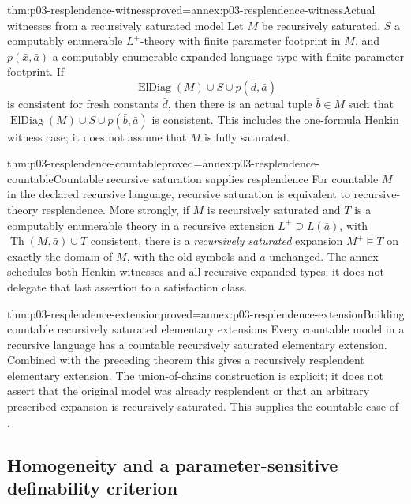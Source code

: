 \begin{hblemma}{thm:p03-resplendence-witness}{proved=annex:p03-resplendence-witness}{Actual witnesses from a recursively saturated model}
Let \(M\) be recursively saturated, \(S\) a computably enumerable
\(L^+\)-theory with finite parameter footprint in \(M\), and
\(p(\bar x,\bar a)\) a computably enumerable expanded-language type
with finite parameter footprint. If
\[
 \operatorname{ElDiag}(M)\cup S\cup p(\bar d,\bar a)
\]
is consistent for fresh constants \(\bar d\), then there is an actual
tuple \(\bar b\in M\) such that
\(\operatorname{ElDiag}(M)\cup S\cup p(\bar b,\bar a)\) is consistent.
This includes the one-formula Henkin witness case; it does not assume
that \(M\) is fully saturated.
\end{hblemma}

\begin{hbtheorem}{thm:p03-resplendence-countable}{proved=annex:p03-resplendence-countable}{Countable recursive saturation supplies resplendence}
For countable \(M\) in the declared recursive language, recursive
saturation is equivalent to recursive-theory resplendence. More strongly,
if \(M\) is recursively saturated and \(T\) is a computably enumerable
theory in a recursive extension \(L^+\supseteq L(\bar a)\), with
\(\operatorname{Th}(M,\bar a)\cup T\) consistent, there is a
\emph{recursively saturated} expansion \(M^+\models T\) on exactly
the domain of \(M\), with the old symbols and \(\bar a\) unchanged.
The annex schedules both Henkin witnesses and all recursive expanded
types; it does not delegate that last assertion to a satisfaction class.
\end{hbtheorem}

\begin{hbtheorem}{thm:p03-resplendence-extension}{proved=annex:p03-resplendence-extension}{Building countable recursively saturated elementary extensions}
Every countable model in a recursive language has a countable recursively
saturated elementary extension. Combined with the preceding theorem this
gives a recursively resplendent elementary extension. The union-of-chains
construction is explicit; it does not assert that the original model was
already resplendent or that an arbitrary prescribed expansion is recursively
saturated. This supplies the countable case of
\cite[Proposition~1.4, p.~10]{Engstrom2004Expansions}.
\end{hbtheorem}

\subsection{Homogeneity and a parameter-sensitive definability criterion}


